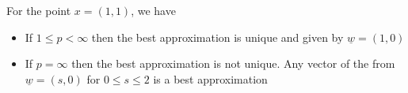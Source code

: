 \documentclass[11pt,twoside]{report}
\newcommand{\bbR}{{\mathbb{R}}}
\newcommand{\vecnot}{\underline}
\begin{document}
\begin{itemize}
\begin{center}
\end{center}

For the point $x = (1,1)$, we have 
\begin{itemize}
\item If $1 \le p  < \infty$ then the  best approximation is unique and given by $\vecnot{w} =  (1 ,0 )$
\item If $p =\infty$  then the best approximation is not unique. Any vector of the from $\vecnot{w} =  (s ,0 )$ for $0 \le s \le 2$ is a best approximation
\end{itemize}


%
%
%     
%
%
%


\end{itemize}
\end{document}
